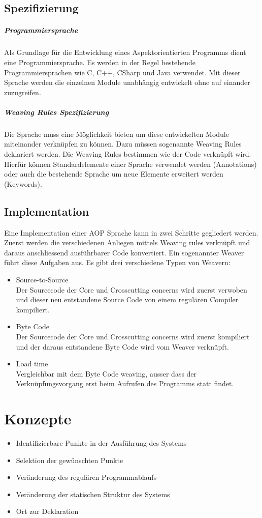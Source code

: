 \subsection{Spezifizierung}
\subparagraph{Programmiersprache}
Als Grundlage für die Entwicklung eines Aspektorientierten Programms dient eine Programmiersprache. Es werden in der Regel bestehende Programmiersprachen wie C, C++, CSharp und Java verwendet. Mit dieser Sprache werden die einzelnen Module unabhängig entwickelt ohne auf einander zuzugreifen.
\subparagraph{Weaving Rules Spezifizierung}
Die Sprache muss eine Möglichkeit bieten um diese entwickelten Module miteinander verknüpfen zu können. Dazu müssen sogenannte Weaving Rules deklariert werden. Die Weaving Rules bestimmen wie der Code verknüpft wird. Hierfür können Standardelemente einer Sprache verwendet werden (Annotations) oder auch die bestehende Sprache um neue Elemente erweitert werden (Keywords).
\subsection{Implementation}
Eine Implementation einer AOP Sprache kann in zwei Schritte gegliedert werden. Zuerst werden die verschiedenen Anliegen mittels Weaving rules verknüpft und daraus anschliessend ausführbarer Code konvertiert.
Ein sogenannter Weaver führt diese Aufgaben aus. Es gibt drei verschiedene Typen von Weavern:

\begin{itemize}
\item Source-to-Source \\ Der Sourcecode der Core und Crosscutting concerns wird zuerst verwoben und dieser neu entstandene Source Code von einem regulären Compiler kompiliert. 
\item Byte Code \\ Der Sourcecode der Core und Crosscutting concerns wird zuerst kompiliert und der daraus entstandene Byte Code wird vom Weaver verknüpft.
\item Load time \\ Vergleichbar mit dem Byte Code weaving, ausser dass der Verknüpfungsvorgang erst beim Aufrufen des Programms statt findet.
\end{itemize}

\section{Konzepte}

\begin{itemize}
\item Identifizierbare Punkte in der Ausführung des Systems
\item Selektion der gewünschten Punkte
\item Veränderung des regulären Programmablaufs
\item Veränderung der statischen Struktur des Systems
\item Ort zur Deklaration
\end{itemize}

